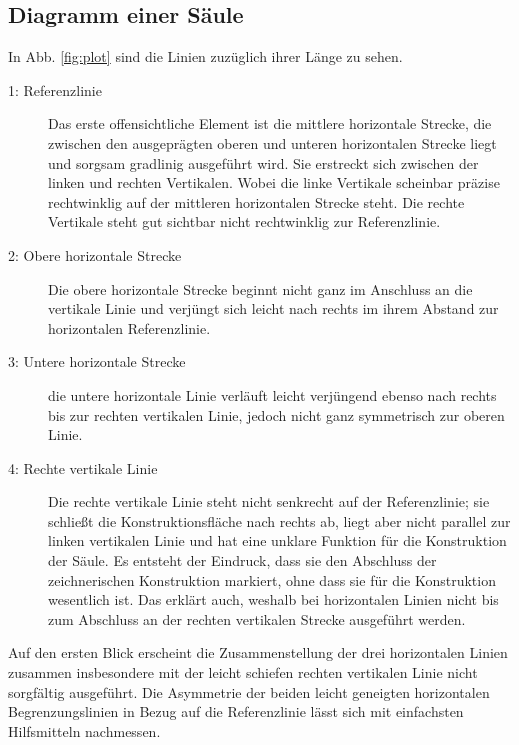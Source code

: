 \documentclass[twocolumn]{bmcart}
\begin{document}
\subsection{Diagramm einer Säule}

In Abb. \ref{fig:plot} sind die Linien zuzüglich ihrer Länge zu sehen. 

\begin{description}
\item[1: Referenzlinie] Das erste offensichtliche Element ist die mittlere horizontale Strecke, die zwischen den ausgeprägten oberen und unteren horizontalen Strecke liegt und sorgsam gradlinig ausgeführt wird. Sie erstreckt sich zwischen der linken und rechten Vertikalen. Wobei die linke Vertikale scheinbar präzise rechtwinklig auf der mittleren horizontalen Strecke steht. Die rechte Vertikale steht gut sichtbar nicht rechtwinklig zur Referenzlinie.
\item[2: Obere horizontale Strecke]  Die obere horizontale Strecke beginnt nicht ganz im Anschluss an die vertikale Linie und verjüngt sich leicht nach rechts im ihrem Abstand zur horizontalen Referenzlinie. 
\item[3: Untere horizontale Strecke]  die untere horizontale Linie verläuft leicht verjüngend ebenso nach rechts bis zur rechten vertikalen Linie, jedoch nicht ganz symmetrisch zur oberen Linie.
\item[4: Rechte vertikale Linie] Die rechte vertikale Linie steht nicht senkrecht auf der Referenzlinie; sie schließt die Konstruktionsfläche nach rechts ab, liegt aber nicht parallel zur linken vertikalen Linie und hat eine unklare Funktion für die Konstruktion der Säule. Es entsteht der Eindruck, dass sie den Abschluss der zeichnerischen Konstruktion markiert, ohne dass sie für die Konstruktion wesentlich ist. Das erklärt auch, weshalb bei horizontalen Linien nicht bis zum Abschluss an der rechten vertikalen Strecke ausgeführt werden.
\end{description}

Auf den ersten Blick erscheint die Zusammenstellung der drei horizontalen Linien zusammen insbesondere mit der leicht schiefen rechten vertikalen Linie nicht sorgfältig ausgeführt. Die Asymmetrie der beiden leicht geneigten horizontalen Begrenzungslinien in Bezug auf die Referenzlinie lässt sich mit einfachsten Hilfsmitteln nachmessen.
\end{document}
